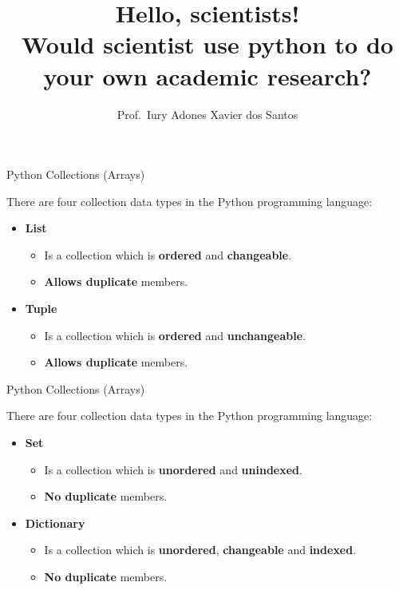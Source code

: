 \documentclass[hyperref={pdfpagelabels=false}]{beamer}
\title[Python Easy]{
    {Hello, scientists!}\\[10mm]
    Would scientist use python to do your own academic research?
}
\author[Prof.~Iury Adones]{
    Prof.~Iury Adones Xavier dos Santos
}
\institute[UFRPE]{
    Rural Federal University of Pernambuco
}
\date[Brazil, Recife--PE]{}
\begin{document}
\begin{frame}
  \maketitle
\end{frame}

\begin{frame}{Python Collections (Arrays)}

There are four collection data types in the Python programming language:

\begin{itemize}[<+->]
\item \textbf{List}
    \begin{itemize}
    \item Is a collection which is \textbf{ordered} and \textbf{changeable}.
    \item \textbf{Allows duplicate} members.
    \end{itemize}
\item \textbf{Tuple}
    \begin{itemize}
    \item Is a collection which is \textbf{ordered} and \textbf{unchangeable}.
    \item \textbf{Allows duplicate} members.
    \end{itemize}
\end{itemize}
\end{frame}

\begin{frame}{Python Collections (Arrays)}

There are four collection data types in the Python programming language:

\begin{itemize}[<+->]
\item \textbf{Set}
    \begin{itemize}
    \item Is a collection which is \textbf{unordered} and \textbf{unindexed}.
    \item \textbf{No duplicate} members.
    \end{itemize}
\item \textbf{Dictionary}
    \begin{itemize}
    \item Is a collection which is \textbf{unordered}, \textbf{changeable} and \textbf{indexed}.
    \item \textbf{No duplicate} members.
    \end{itemize}
\end{itemize}
\end{frame}
\end{document}
